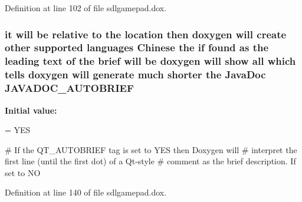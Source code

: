 Definition at line 102 of file sdlgamepad.\-dox.

\hypertarget{sdlgamepad_8dox_aabdcd7fd8cfe4a4c6f9ad5b932398ab2}{
\subsubsection[{J\-A\-V\-A\-D\-O\-C\-\_\-\-A\-U\-T\-O\-B\-R\-I\-E\-F}]{\setlength{\rightskip}{0pt plus 5cm}it will be relative to the {\bf location} then doxygen will create other supported languages {\bf Chinese} the {\bf if} found as the leading text of the brief will be doxygen will show all which tells doxygen will generate much shorter the Java\-Doc J\-A\-V\-A\-D\-O\-C\-\_\-\-A\-U\-T\-O\-B\-R\-I\-E\-F}}\label{sdlgamepad_8dox_aabdcd7fd8cfe4a4c6f9ad5b932398ab2}
{\bfseries Initial value\-:}
\begin{DoxyCode}
= YES

\textcolor{preprocessor}{# If the QT\_AUTOBRIEF tag is set to YES then Doxygen will}
\textcolor{preprocessor}{}\textcolor{preprocessor}{# interpret the first line (until the first dot) of a Qt-style}
\textcolor{preprocessor}{# comment as the brief description. If set to NO}
\end{DoxyCode}


Definition at line 140 of file sdlgamepad.\-dox.

